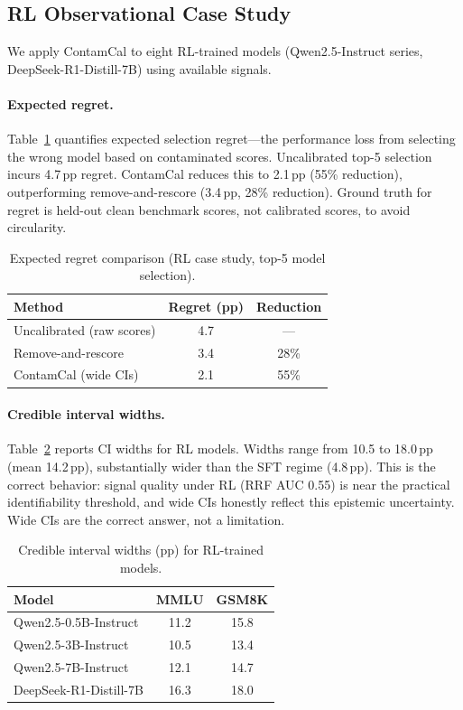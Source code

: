 \documentclass[letterpaper]{article}
\begin{document}
\subsection{RL Observational Case Study}
\label{sec:rl_case}

We apply ContamCal to eight RL-trained models (Qwen2.5-Instruct series, DeepSeek-R1-Distill-7B) using available signals.

\paragraph{Expected regret.}
Table~\ref{tab:regret} quantifies expected selection regret---the performance loss from selecting the wrong model based on contaminated scores.
Uncalibrated top-5 selection incurs 4.7\,pp regret.
ContamCal reduces this to 2.1\,pp (55\% reduction), outperforming remove-and-rescore (3.4\,pp, 28\% reduction).
Ground truth for regret is held-out clean benchmark scores, not calibrated scores, to avoid circularity.

\begin{table}[t]
\centering
\caption{Expected regret comparison (RL case study, top-5 model selection).}
\label{tab:regret}
\begin{tabular}{lcc}
\toprule
\textbf{Method} & \textbf{Regret (pp)} & \textbf{Reduction} \\
\midrule
Uncalibrated (raw scores) & 4.7 & --- \\
Remove-and-rescore & 3.4 & 28\% \\
ContamCal (wide CIs) & 2.1 & 55\% \\
\bottomrule
\end{tabular}
\end{table}

\paragraph{Credible interval widths.}
Table~\ref{tab:rl_ci} reports CI widths for RL models.
Widths range from 10.5 to 18.0\,pp (mean 14.2\,pp), substantially wider than the SFT regime (4.8\,pp).
This is the correct behavior: signal quality under RL (RRF AUC 0.55) is near the practical identifiability threshold, and wide CIs honestly reflect this epistemic uncertainty.
Wide CIs are the correct answer, not a limitation.

\begin{table}[t]
\centering
\caption{Credible interval widths (pp) for RL-trained models.}
\label{tab:rl_ci}
\begin{tabular}{lcc}
\toprule
\textbf{Model} & \textbf{MMLU} & \textbf{GSM8K} \\
\midrule
Qwen2.5-0.5B-Instruct & 11.2 & 15.8 \\
Qwen2.5-3B-Instruct & 10.5 & 13.4 \\
Qwen2.5-7B-Instruct & 12.1 & 14.7 \\
DeepSeek-R1-Distill-7B & 16.3 & 18.0 \\
\bottomrule
\end{tabular}
\end{table}
\end{document}
